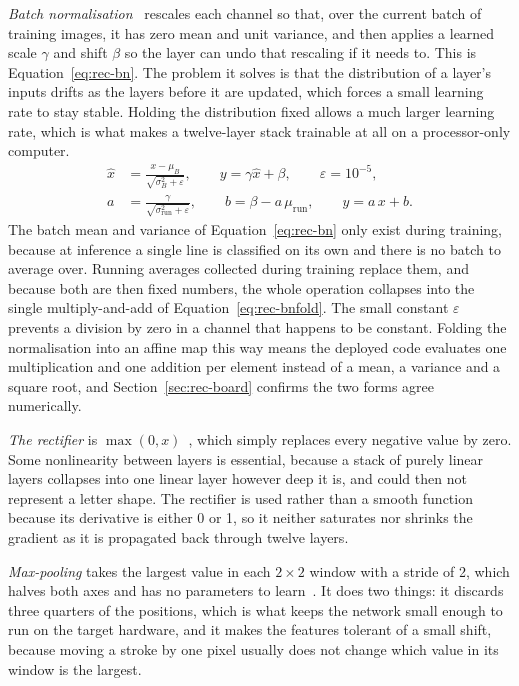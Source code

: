 \emph{Batch normalisation}~\cite{ioffe2015} rescales each channel so that, over the current batch of training images, it has zero mean and unit variance, and then applies a learned scale $\gamma$ and shift $\beta$ so the layer can undo that rescaling if it needs to. This is Equation~\ref{eq:rec-bn}. The problem it solves is that the distribution of a layer's inputs drifts as the layers before it are updated, which forces a small learning rate to stay stable. Holding the distribution fixed allows a much larger learning rate, which is what makes a twelve-layer stack trainable at all on a processor-only computer.
\begin{align}
\hat x&=\frac{x-\mu_B}{\sqrt{\sigma_B^2+\varepsilon}},\qquad y=\gamma\hat x+\beta,\qquad\varepsilon=10^{-5},\label{eq:rec-bn}\\
a&=\frac{\gamma}{\sqrt{\sigma^2_{\mathrm{run}}+\varepsilon}},\qquad b=\beta-a\,\mu_{\mathrm{run}},\qquad y=a\,x+b.\label{eq:rec-bnfold}
\end{align}
The batch mean and variance of Equation~\ref{eq:rec-bn} only exist during training, because at inference a single line is classified on its own and there is no batch to average over. Running averages collected during training replace them, and because both are then fixed numbers, the whole operation collapses into the single multiply-and-add of Equation~\ref{eq:rec-bnfold}. The small constant $\varepsilon$ prevents a division by zero in a channel that happens to be constant. Folding the normalisation into an affine map this way means the deployed code evaluates one multiplication and one addition per element instead of a mean, a variance and a square root, and Section~\ref{sec:rec-board} confirms the two forms agree numerically.

\emph{The rectifier} is $\max(0,x)$~\cite{nair2010}, which simply replaces every negative value by zero. Some nonlinearity between layers is essential, because a stack of purely linear layers collapses into one linear layer however deep it is, and could then not represent a letter shape. The rectifier is used rather than a smooth function because its derivative is either 0 or 1, so it neither saturates nor shrinks the gradient as it is propagated back through twelve layers.

\emph{Max-pooling} takes the largest value in each $2\times2$ window with a stride of 2, which halves both axes and has no parameters to learn~\cite{ji2021}. It does two things: it discards three quarters of the positions, which is what keeps the network small enough to run on the target hardware, and it makes the features tolerant of a small shift, because moving a stroke by one pixel usually does not change which value in its window is the largest.

